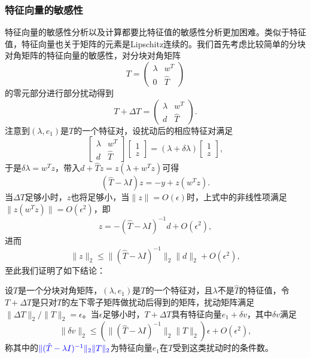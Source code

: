 \documentclass[a4paper,10pt]{ctexart}
\begin{document}
\subsubsection{特征向量的敏感性}
特征向量的敏感性分析以及计算都要比特征值的敏感性分析更加困难。类似于特征值，特征向量也关于矩阵的元素是Lipschitz连续的。我们首先考虑比较简单的分块对角矩阵的特征向量的敏感性，对分块对角矩阵
\[
    T = 
    \begin{pmatrix} 
        \lambda & w^T \\
        0 & \hat{T} 
    \end{pmatrix} 
\]
的零元部分进行部分扰动得到
\[
    T + \Delta T = 
    \begin{pmatrix} 
        \lambda & w^T \\
        d & \hat{T}
    \end{pmatrix}.
\]
注意到$ (\lambda,e_1) $是$ T $的一个特征对，设扰动后的相应特征对满足
\[
    \begin{bmatrix} 
        \lambda & w^T \\
        d & \hat{T} 
    \end{bmatrix} 
    \begin{bmatrix} 
        1 \\ z
    \end{bmatrix} =(\lambda+\delta \lambda)
    \begin{bmatrix} 
        1 \\ z 
    \end{bmatrix} ,
\]
于是$ \delta \lambda = w^T z $，带入$ d + \hat{T} z = z (\lambda + w^T z) $可得
\[
    (\hat{T} - \lambda I)z = -y + z(w^T z).
\]
当$ \Delta T $足够小时，$ z $也将足够小，当$ \| z \| = O(\epsilon) $时，上式中的非线性项满足$ \| z(w^T z) \| = O(\epsilon^2) $，即
\[
    z = -(\hat{T} - \lambda I)^{-1} d + O(\epsilon^2),
\]
进而
\begin{equation}
    \| z \|_2 \leqslant \| (\hat{T}-\lambda I)^{-1} \|_2 \| d \|_2 + O(\epsilon^2),
\end{equation}
至此我们证明了如下结论：
\begin{lemma}
    设$ T $是一个分块对角矩阵，$ (\lambda,e_1) $是$ T $的一个特征对，且$ \lambda $不是$ \hat{T} $的特征值，令$ T+\Delta T $是只对$ T $的左下零子矩阵做扰动后得到的矩阵，扰动矩阵满足$ \| \Delta T \|_2 / \| T \|_2 = \epsilon $。当$ \epsilon $足够小时，$ T+\Delta T $具有特征向量$ e_1 + \delta v $，其中$ \delta v $满足
    \begin{equation}
        \| \delta v \|_2 \leqslant (\| (\hat{T}-\lambda I)^{-1} \|_2 \| T \|_2 )\epsilon + O(\epsilon^2),
    \end{equation}
    称其中的$ \textcolor{blue}{\| (\hat{T}-\lambda I)^{-1} \|_2 \| T \|_2} $为特征向量$ e_1 $在$ T $受到这类扰动时的条件数。
\end{lemma}
\end{document}
